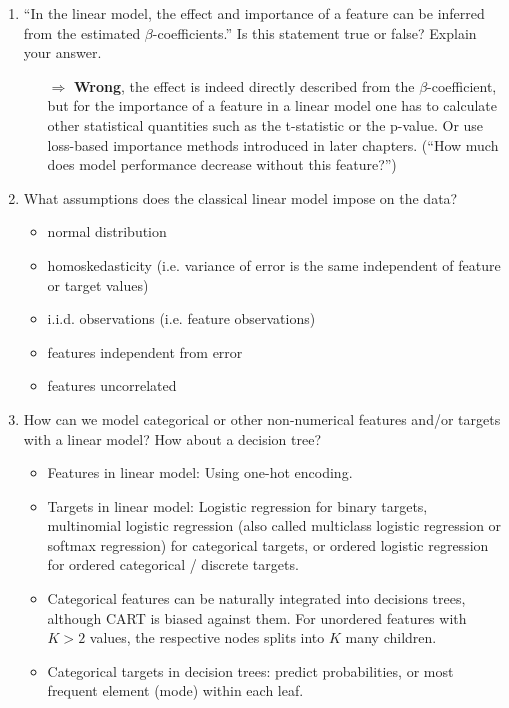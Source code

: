 \begin{enumerate}
\begin{itemize}
        \end{itemize}
    	\item ``In the linear model, the effect and importance of a feature can be inferred from the estimated $\beta$-coefficients.'' Is this statement true or false? Explain your answer.
    	\begin{itemize}
    		\item[$\Rightarrow$] \textbf{Wrong}, the effect is indeed directly described from the \(\beta\)-coefficient, but for the importance of a feature in a linear model one has to calculate other statistical quantities such as the t-statistic or the p-value.
            Or use loss-based importance methods introduced in later chapters. (``How much does model performance decrease without this feature?'')
    	\end{itemize}
        \item What assumptions does the classical linear model impose on the data?
        \begin{itemize}
            \item normal distribution
            \item homoskedasticity (i.e. variance of error is the same independent of feature or target values)
            \item i.i.d. observations (i.e. feature observations)
            \item features independent from error
            \item features uncorrelated
        \end{itemize}
        \item How can we model categorical or other non-numerical features and/or targets with a linear model? How about a decision tree?
        \begin{itemize}
            \item Features in linear model: Using one-hot encoding.
            \item Targets in linear model: Logistic regression for binary targets, multinomial logistic regression (also called multiclass logistic regression or softmax regression) for categorical targets, or ordered logistic regression for ordered categorical / discrete targets.
            \item Categorical features can be naturally integrated into decisions trees, although CART is biased against them. For unordered features with $K>2$ values, the respective nodes splits into $K$ many children.
            \item Categorical targets in decision trees: predict probabilities, or most frequent element (mode) within each leaf. 

\end{itemize}
\end{enumerate}
